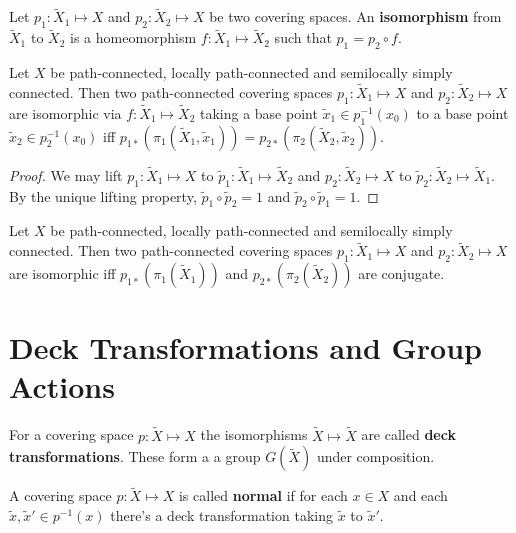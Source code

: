\documentclass[12pt]{book}
\begin{document}
\begin{definition}
	Let $p_1:\tilde X_1\mapsto X$ and $p_2:\tilde X_2\mapsto X$ be two covering spaces. An {\bf isomorphism} from $\tilde X_1$ to $\tilde X_2$ is a homeomorphism $f:\tilde X_1\mapsto \tilde X_2$ such that $p_1=p_2\circ f$.
\end{definition}

\begin{lemma}
	Let $X$ be path-connected, locally path-connected and semilocally simply connected. Then two path-connected covering spaces $p_1:\tilde X_1\mapsto X$ and $p_2:\tilde X_2\mapsto X$ are isomorphic via $f:\tilde X_1\mapsto \tilde X_2$ taking a base point $\tilde x_1\in p^{-1}_1(x_0)$ to a base point $\tilde x_2\in p^{-1}_2(x_0)$ iff $p_{1*}(\pi_1(\tilde X_1,\tilde x_1))=p_{2*}(\pi_2(\tilde X_2,\tilde x_2))$.
\end{lemma}
\begin{proof}
	We may lift $p_1:\tilde X_1\mapsto X$ to $\tilde p_1:\tilde X_1\mapsto \tilde X_2$ and $p_2:\tilde X_2\mapsto X$ to $\tilde p_2:\tilde X_2\mapsto \tilde X_1$. By the unique lifting property, $\tilde p_1\circ \tilde p_2=1$ and $\tilde p_2\circ \tilde p_1=1$.
\end{proof}

\begin{corollary}
	Let $X$ be path-connected, locally path-connected and semilocally simply connected. Then two path-connected covering spaces $p_1:\tilde X_1\mapsto X$ and $p_2:\tilde X_2\mapsto X$ are isomorphic iff $p_{1*}(\pi_1(\tilde X_1))$ and $p_{2*}(\pi_2(\tilde X_2))$ are conjugate.
\end{corollary}

\section{Deck Transformations and Group Actions}

\begin{definition}
	For a covering space $p:\tilde X\mapsto X$ the isomorphisms $\tilde X\mapsto \tilde X$ are called {\bf deck transformations}. These form a a group $G(\tilde X)$ under composition.
\end{definition}

\begin{definition}
	A covering space $p:\tilde X\mapsto X$ is called {\bf normal} if for each $x\in X$ and each $\tilde x,\tilde x'\in p^{-1}(x)$ there's a deck transformation taking $\tilde x$ to $\tilde x'$.
\end{definition}
\end{document}
